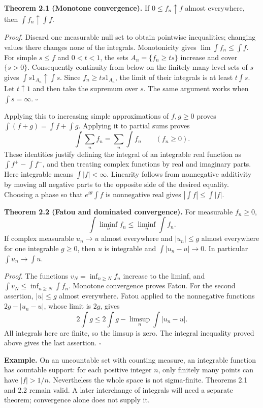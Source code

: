 \documentclass[
  english,
  11pt,
  a4paper,
]{article}
\newcounter{none} %
\begin{document}
\textbf{Theorem 2.1 (Monotone convergence).} If \(0\leq f_n\uparrow f\)
almost everywhere, then \(\int f_n\uparrow\int f\).

\emph{Proof.} Discard one measurable null set to obtain pointwise
inequalities; changing values there changes none of the integrals.
Monotonicity gives \(\lim\int f_n\leq\int f\). For simple \(s\leq f\)
and \(0<t<1\), the sets \(A_n=\{f_n\geq ts\}\) increase and cover
\(\{s>0\}\). Consequently continuity from below on the finitely many
level sets of \(s\) gives \(\int s1_{A_n}\uparrow\int s\). Since
\(f_n\geq ts1_{A_n}\), the limit of their integrals is at least
\(t\int s\). Let \(t\uparrow1\) and then take the supremum over \(s\).
The same argument works when \(\int s=\infty\). \(\square\)

Applying this to increasing simple approximations of \(f,g\geq0\) proves
\(\int(f+g)=\int f+\int g\). Applying it to partial sums proves
\[\int\sum_n f_n=\sum_n\int f_n\qquad(f_n\geq0).
\tag{2.1}\] These identities justify defining the integral of an
integrable real function as \(\int f^+-\int f^-\), and then treating
complex functions by real and imaginary parts. Here integrable means
\(\int|f|<\infty\). Linearity follows from nonnegative additivity by
moving all negative parts to the opposite side of the desired equality.
Choosing a phase so that \(e^{i\theta}\int f\) is nonnegative real gives
\(|\int f|\leq\int|f|\).

\textbf{Theorem 2.2 (Fatou and dominated convergence).} For measurable
\(f_n\geq0\), \[\int\liminf_n f_n\leq\liminf_n\int f_n.\] If complex
measurable \(u_n\to u\) almost everywhere and \(|u_n|\leq g\) almost
everywhere for one integrable \(g\geq0\), then \(u\) is integrable and
\(\int|u_n-u|\to0\). In particular \(\int u_n\to\int u\).

\emph{Proof.} The functions \(v_N=\inf_{n\geq N}f_n\) increase to the
liminf, and \(\int v_N\leq\inf_{n\geq N}\int f_n\). Monotone convergence
proves Fatou. For the second assertion, \(|u|\leq g\) almost everywhere.
Fatou applied to the nonnegative functions \(2g-|u_n-u|\), whose limit
is \(2g\), gives \[2\int g\leq2\int g-\limsup_n\int|u_n-u|.\] All
integrals here are finite, so the limsup is zero. The integral
inequality proved above gives the last assertion. \(\square\)

\textbf{Example.} On an uncountable set with counting measure, an
integrable function has countable support: for each positive integer
\(n\), only finitely many points can have \(|f|>1/n\). Nevertheless the
whole space is not sigma-finite. Theorems 2.1 and 2.2 remain valid. A
later interchange of integrals will need a separate theorem; convergence
alone does not supply it.
\end{document}
